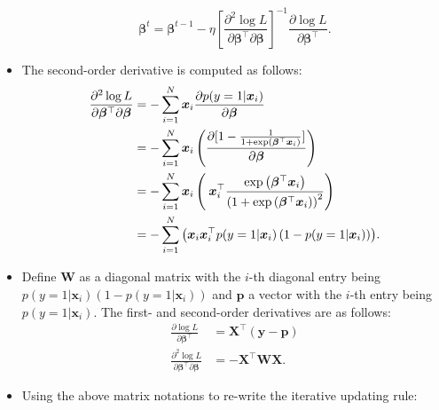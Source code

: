 \begin{itemize}
                    \begin{equation}
                        \bm{\beta}^t = \bm{\beta}^{t-1} - \eta \left[ \frac{\partial^2 \log L}{\partial \bm{\beta}^\top \partial \bm{\beta}} \right]^{-1} \frac{\partial \log L}{\partial \bm{\beta}^\top}.
                    \end{equation}
                \item The second-order derivative is computed as follows:
                    \begin{equation}
                        \begin{aligned}
                            \frac{\partial^2 \log L}{\partial \bm{\beta}^\top \partial \bm{\beta}} & = -\sum_{i=1}^{N}{\bm{x}_i \frac{\partial p(y=1 | \bm{x}_i)}{\partial \bm{\beta}}   }  \\
                            & = - \sum_{i=1}^{N}{\bm{x}_i \left( \frac{\partial [1 - \frac{1}{1+ \text{exp}\left( \bm{\beta}^\top\bm{x}_i \right) }] }{\partial \bm{\beta}} \right)} \\
                            & = - \sum_{i=1}^{N}{\bm{x}_i \left( \frac{}{} \bm{x}^{\top}_i \frac{ \text{exp}\left( \bm{\beta}^\top \bm{x}_i \right) }{\left( 1 +  \text{exp}\left( \bm{\beta}^\top \bm{x}_i \right) \right)^2} \right)} \\
                            & = -\sum_{i=1}^{N}{\left( \bm{x}_i \bm{x}_i^\top p(y=1 | \bm{x}_i) \left( 1 - p(y=1 | \bm{x}_i)\right) \right)}.
                        \end{aligned}
                    \end{equation}
                \item Define $\bm{W}$ as a diagonal matrix with the $i$-th diagonal entry being $p(y=1| \bm{x}_i)(1 - p(y=1 | \bm{x}_i))$ and $\bm{p}$ a vector with the $i$-th entry being $p(y=1|\bm{x}_i)$.
                The first- and second-order derivatives are as follows:
                    \begin{equation}
                        \begin{aligned}
                            \frac{\partial \log L}{\partial \bm{\beta}^\top} & = \bm{X}^\top (\bm{y} - \bm{p}) \\
                            \frac{\partial^2 \log L}{\partial \bm{\beta}^\top \partial \bm{\beta}} & = -\bm{X}^\top \bm{W} \bm{X}.
                        \end{aligned}
                    \end{equation}  
                \item Using the above matrix notations to re-write the iterative updating rule:

\end{itemize}
